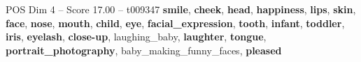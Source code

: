 \begin{textsample}{POS Dim 4 – Score 17.00 – t009347}  \label{ex:f4_pos_033}
\textbf{smile}, \textbf{cheek}, \textbf{head}, \textbf{happiness}, \textbf{lips}, \textbf{skin}, \textbf{face}, \textbf{nose}, \textbf{mouth}, \textbf{child}, \textbf{eye}, \textbf{facial\_expression}, \textbf{tooth}, \textbf{infant}, \textbf{toddler}, \textbf{iris}, \textbf{eyelash}, \textbf{close-up}, laughing\_baby, \textbf{laughter}, \textbf{tongue}, \textbf{portrait\_photography}, baby\_making\_funny\_faces, \textbf{pleased}

\end{textsample}
